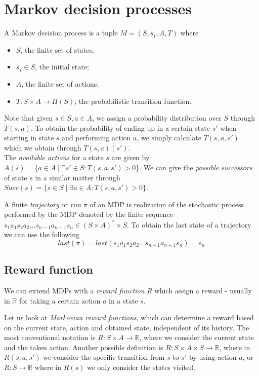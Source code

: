 \section{Markov decision processes}

\begin{definition}[MDP]
	A Markov decision process is a tuple $M=(S,s_I,A,T)$ where 
	\begin{itemize}
		\item $S$, the finite set of states;
		\item $s_I\in S$, the initial state;
		\item $A$, the finite set of actions;
		\item $T:S\times A\to \Pi(S)$, the probabilistic transition function.
	\end{itemize}
\end{definition}

Note that given $s\in S,a\in A$, we assign a probability distribution over $S$ through $T(s,a)$. To obtain the probability of ending up in a certain state $s'$ when starting in state $s$ and performing action $a$, we simply calculate $T(s,a,s')$ which we obtain through $T(s,a)(s')$.\\

The \textit{available actions} for a state $s$ are given by $A(s)=\{a\in A\mid \exists s'\in S: T(s,a,s')>0\}$. We can give the \textit{possible successors} of state $s$ in a similar matter through $Succ(s)=\{s\in S\mid\exists a\in A : T(s,a,s')>0\}$.

A finite \textit{trajectory} or \textit{run} $\pi$ of an MDP is realization of the stochastic process performed by the MDP denoted by the finite sequence $s_1 a_1 s_2 a_2\dots s_{n-1} a_{n-1} s_n \in (S\times A)^*\times S$. To obtain the last state of a trajectory we can use the following \[last(\pi)=last(s_1 a_1 s_2 a_2\dots s_{n-1} a_{n-1} s_n)=s_n\]

\subsection*{Reward function}
We can extend MDPs with a \textit{reward function} $R$ which assign a reward - usually in $\mathbb{R}$ for taking a certain action $a$ in a state $s$. 


Let us look at \textit{Markovian reward functions}, which can determine a reward based on the current state, action and obtained state, independent of its history. The most conventional notation is $R:S\times A\to \mathbb{R}$, where we consider the current state and the taken action. Another possible definition is $R:S\times A\times S\to\mathbb{R}$, where  in $R(s,a,s')$ we consider the specific transition from $s$ to $s'$ by using action $a$, or $R:S\to\mathbb{R}$ where in $R(s)$ we only consider the states visited.


